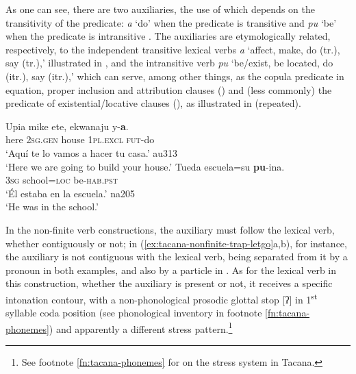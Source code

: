 \documentclass[output=paper]{langsci/langscibook}
\begin{document}
As one can see, there are two auxiliaries, the use of which depends on the
transitivity of the predicate: \textit{a} `do' when the predicate is
transitive  and \textit{pu} `be' when the
predicate is intransitive . The auxiliaries
are etymologically related, respectively, to the independent transitive
lexical verbs \textit{a} `affect, make, do (tr.), say (tr.),' illustrated
in , and the intransitive verb
\textit{pu} `be\slash exist, be located, do (itr.), say (itr.),' which can
serve, among other things, as the copula predicate in equation, proper
inclusion and attribution clauses () and (less
commonly) the predicate of existential\slash locative clauses
(), as illustrated in
 (repeated).

\begin{exe}\ex
\label{ex:tacana-auxetymologies-build-school}  
\begin{xlist}
\ex\label{ex:tacana-auxetymologies-build}
\gll Upia  mike  ete,  ekwanaju  y-\textbf{a}.\\
    here  \textsc{2sg.gen}  house  \textsc{1pl.excl}  \textsc{fut}-do\\
\glt `Aquí te lo vamos a hacer tu casa.' au313\\
`Here we are going to build your house.'
\ex\label{ex:tacana-auxetymologies-school}
 \gll   Tueda  escuela=su  \textbf{pu}{-ina}.\\
    3\textsc{sg}  school=\textsc{loc}  be-\textsc{hab.pst}\\
\glt `Él estaba en la escuela.' na205\\
`He was in the school.'
\end{xlist}\end{exe}


In the non-finite verb constructions, the auxiliary must follow the lexical
verb, whether contiguously or not; in
(\ref{ex:tacana-nonfinite-trap-letgo}a,b), for instance, the auxiliary is
not contiguous with the lexical verb, being separated from it by a pronoun
in both examples, and also by a particle in .
As for the lexical verb in this construction, whether the auxiliary is
present or not, it receives a specific intonation contour, with a
non-phonological prosodic glottal stop [ʔ] in 1\textsuperscript{st}
syllable coda position (see phonological inventory in footnote
\ref{fn:tacana-phonemes}) and apparently a different stress
pattern.\footnote{See footnote \ref{fn:tacana-phonemes} for on the stress system in Tacana.}
\end{document}

